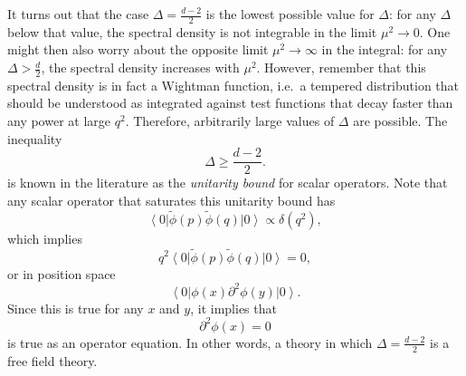 \documentclass[a4paper,12pt]{article}
\newcommand{\ket}[1]{\left| #1 \right\rangle}
\newcommand{\bra}[1]{\left\langle #1 \right|}
\numberwithin{equation}{section}
\begin{document}
It turns out that the case $\Delta = \frac{d-2}{2}$ is the lowest possible value for $\Delta$: for any $\Delta$ below that value, the spectral density is not integrable in the limit $\mu^2 \to 0$.
One might then also worry about the opposite limit $\mu^2 \to \infty$ in the integral: for any $\Delta > \frac{d}{2}$, the spectral density increases with $\mu^2$. However, remember that this spectral density is in fact a Wightman function, i.e.~a tempered distribution that should be understood as integrated against test functions that decay faster than any power at large $q^2$. Therefore, arbitrarily large values of $\Delta$ are possible.
The inequality
\begin{equation}
	\Delta \geq \frac{d-2}{2}.
	\label{eq:unitarybound:scalar}
\end{equation}
is known in the literature as the \emph{unitarity bound} for scalar operators. Note that any scalar operator that saturates this unitarity bound has
\begin{equation}
	\bra{0} \widetilde{\phi}(p) \widetilde{\phi}(q) \ket{0}
	\propto \delta(q^2),
\end{equation}
which implies
\begin{equation}
	q^2 \bra{0} \widetilde{\phi}(p) \widetilde{\phi}(q) \ket{0}
	= 0,
\end{equation}
or in position space
\begin{equation}
	\bra{0} \phi(x) \partial^2 \phi(y) \ket{0}.
\end{equation}
Since this is true for any $x$ and $y$, it implies that
\begin{equation}
	\partial^2 \phi(x) = 0
\end{equation}
is true as an operator equation. In other words, a theory in which $\Delta = \frac{d-2}{2}$ is a free field theory.
\end{document}
